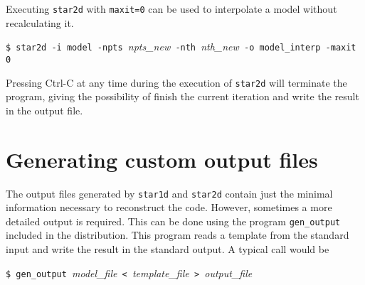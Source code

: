 Executing {\tt star2d} with {\tt maxit=0} can be used to interpolate a model without
recalculating it.

\medskip
\noindent
\verb|$ star2d -i model -npts |{\it npts\_new}\verb| -nth |{\it nth\_new}\verb| -o model_interp -maxit 0|

\medskip
Pressing Ctrl-C at any time during the execution of {\tt star2d} will terminate
the program, giving the possibility of finish the current iteration and write the result in the
output file.




\section{Generating custom output files}

The output files generated by {\tt star1d} and {\tt star2d} contain just the minimal 
information necessary to reconstruct the code. However, sometimes a more detailed output 
is required.
This can be done using the program {\tt gen\_output} included in the distribution. This
program reads a template from the standard input and write the result in the standard output.
A typical call would be

\medskip
\noindent
\verb|$ gen_output |{\it model\_file}\verb| < |{\it template\_file}\verb| > |{\it output\_file}

\medskip


